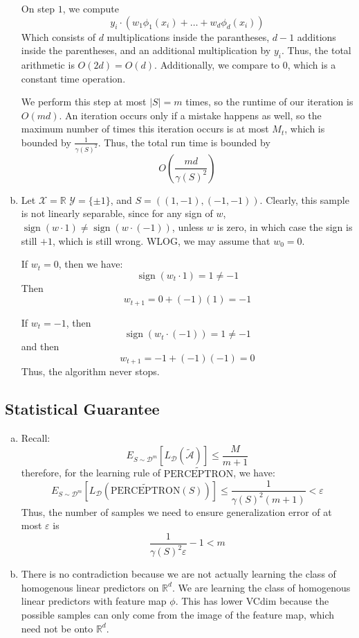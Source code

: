 \documentclass{amsart}
\newcommand{\rr}{\mathbb R}    %
\newcommand{\cA}{\mathcal{A}}
\newcommand{\cD}{\mathcal{D}}
\newcommand{\Per}{\widetilde{\mathrm{PERCEPTRON}}}
\DeclareMathOperator{\sign}{sign}
\theoremstyle{definition}
\begin{document}
\begin{enumerate}[(a)]
    On step $1$, we compute 
    \[
      y_i \cdot (w_1 \phi_1(x_i) + \ldots + w_d \phi_d(x_i))
    \]
    Which consists of $d$ multiplications inside the parantheses, $d-1$ additions inside the parentheses, and an additional multiplication by $y_i$. Thus, the total arithmetic is $O(2d) = O(d)$. Additionally, we compare to $0$, which is a constant time operation. 

    We perform this step at most $|S| = m$ times, so the runtime of our iteration is $O(md)$. An iteration occurs only if a mistake happens as well, so the maximum number of times this iteration occurs is at most $M_t$, which is bounded by $\frac{1}{\gamma(S)^2}$. Thus, the total run time is bounded by
    \[
      O\left(\frac{md}{\gamma(S)^2}\right)
    \]
  \item 
    Let $\mathcal{X} = \rr$ $\mathcal{Y} = \{\pm 1\}$, and $S = ((1, -1), (-1, -1))$. Clearly, this sample is not linearly separable, since for any sign of $w$, $\sign(w \cdot 1) \neq \sign(w \cdot (-1))$, unless $w$ is zero, in which case the sign is still $+1$, which is still wrong. WLOG, we may assume that $w_0 = 0$. 

    If $w_t = 0$, then we have:
    \[
      \sign(w_t \cdot 1) = 1 \neq -1
    \]
    Then \[
      w_{t+1} = 0 + (-1)(1) = -1
    \]

    If $w_t = -1$, then 
    \[
      \sign(w_t \cdot(-1)) = 1 \neq -1
    \]
    and then 
    \[
      w_{t+1} = -1 + (-1)(-1) = 0
    \]
    Thus, the algorithm never stops.
\end{enumerate}
\subsection{Statistical Guarantee}
\begin{enumerate}[(a)]
  \item 
    Recall: 
    \[
      E_{S \sim \cD^m}[L_{\cD}(\tilde{\cA})] \le \frac{M }{m+1}
    \]
    therefore, for the learning rule of $\Per$, we have:
    \[
      E_{S \sim \cD^m}[L_{\cD}(\Per(S))] \le \frac{1}{\gamma(S)^2(m+1)} < \varepsilon
    \]
    Thus, the number of samples we need to ensure generalization error of at most $\varepsilon$ is 
    \[
      \frac{1}{\gamma(S)^2 \varepsilon } - 1 < m
    \]
  \item 
    There is no contradiction because we are not actually learning the class of homogenous linear predictors on $\rr^d$. We are learning the class of homogenous linear predictors with feature map $\phi$. This has lower VCdim because the possible samples can only come from the image of the feature map, which need not be onto $\rr^d$. 
\end{enumerate}
\end{document}
